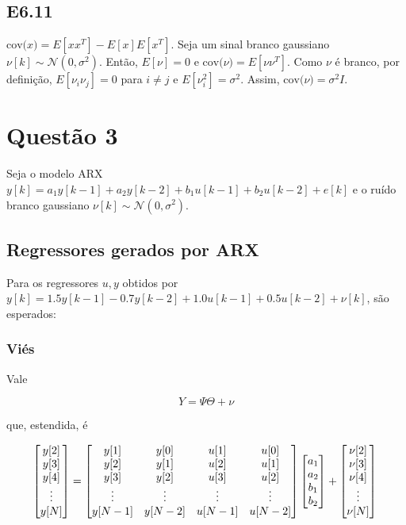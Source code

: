 \documentclass{article}
\begin{document}
\subsection*{E6.11}

$\text{cov($x$)} = E[xx^T] - E[x]E[x^T]$. Seja um sinal branco gaussiano $\nu[k] \sim \mathcal{N}(0, \sigma^2)$. Então, $E[\nu] = 0$ e $\text{cov($\nu$)} = E[\nu\nu^T]$. Como $\nu$ é branco, por definição, $E[\nu_i\nu_j] = 0$ para $i \ne j$ e $E[\nu_i^2] = \sigma^2$. Assim, $\text{cov($\nu$)} = \sigma^2I$.

\section*{Questão 3}

Seja o modelo ARX $y[k] = a_1y[k-1] + a_2y[k-2] + b_1u[k-1] + b_2u[k-2] + e[k]$ e o ruído branco gaussiano $\nu[k] \sim \mathcal{N}(0, \sigma^2)$.

\subsection*{Regressores gerados por ARX}

Para os regressores $u, y$ obtidos por $y[k] = 1.5y[k-1] - 0.7y[k-2] + 1.0u[k-1] + 0.5u[k-2] + \nu[k]$, são esperados:

\subsubsection*{Viés}

Vale

\begin{equation*}
Y = \Psi\Theta + \nu
\end{equation*}

que, estendida, é

\begin{equation*}
\begin{bmatrix}
y[2] \\
y[3] \\
y[4] \\
\vdots \\
y[N]
\end{bmatrix} =
\begin{bmatrix}
y[1] & y[0] & u[1] & u[0] \\
y[2] & y[1] & u[2] & u[1] \\
y[3] & y[2] & u[3] & u[2] \\
\vdots & \vdots & \vdots & \vdots \\
y[N-1] & y[N-2] & u[N-1] & u[N-2]
\end{bmatrix}
\begin{bmatrix}
a_1 \\
a_2 \\
b_1 \\
b_2
\end{bmatrix} +
\begin{bmatrix}
\nu[2] \\
\nu[3] \\
\nu[4] \\
\vdots \\
\nu[N]
\end{bmatrix} \\
\end{equation*}
\end{document}
